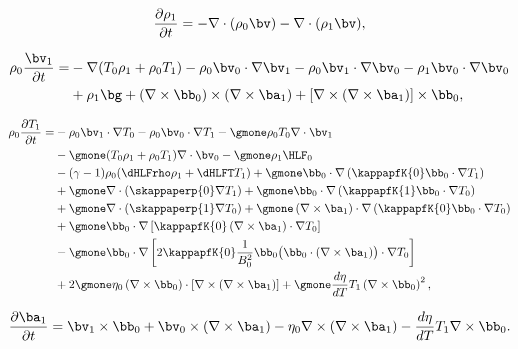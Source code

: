 {\customEquationFont

\begin{equation} \label{eq: linearised_continuity}
  \frac{\partial \rho_1}{\partial t} = -\nabla \cdot (\rho_0 \bv) - \nabla \cdot (\rho_1 \bv),
\end{equation}

\begin{equation} \label{eq: linearised_momentum}
  \begin{aligned}
    \rho_0\frac{\bv_1}{\partial t} =&
      -\nabla(T_0\rho_1 + \rho_0 T_1)
      - \rho_0 \bv_0 \cdot \nabla\bv_1
      - \rho_0\bv_1 \cdot \nabla \bv_0
      - \rho_1 \bv_0 \cdot \nabla \bv_0 \\
      \quad&
      + \rho_1 \bg
      + (\nabla \times \bb_0) \times (\nabla \times \ba_1)
      + [\nabla \times (\nabla \times \ba_1)] \times \bb_0,
  \end{aligned}
\end{equation}

\begingroup
\allowdisplaybreaks
\begin{equation} \label{eq: linearised_energy}
  \begin{aligned}
    \rho_0\frac{\partial T_1}{\partial t} =&
      - \rho_0\bv_1 \cdot \nabla T_0
      - \rho_0 \bv_0 \cdot \nabla T_1
      - \gmone\rho_0 T_0 \nabla \cdot \bv_1 \\
      \quad&
      - \gmone(T_0 \rho_1 + \rho_0 T_1)\nabla \cdot \bv_0
      - \gmone\rho_1 \HLF_0 \\
      \quad&
      - (\gamma - 1)\rho_0(\dHLFrho \rho_1 + \dHLFT T_1)
      + \gmone \bb_0 \cdot \nabla\left(\kappapfK{0}\bb_0 \cdot \nabla T_1 \right) \\
      \quad&
      + \gmone \nabla \cdot \left(\skappaperp{0}\nabla T_1\right)
      + \gmone \bb_0 \cdot \nabla \left(\kappapfK{1} \bb_0 \cdot \nabla T_0\right) \\
      \quad&
      + \gmone \nabla \cdot \left(\skappaperp{1} \nabla T_0\right)
      + \gmone \left(\nabla \times \ba_1\right) \cdot \nabla \left(\kappapfK{0}\bb_0 \cdot \nabla T_0\right) \\
      \quad&
      + \gmone \bb_0 \cdot \nabla \left[\kappapfK{0}\left(\nabla \times \ba_1\right) \cdot \nabla T_0\right] \\
      \quad&
      - \gmone \bb_0 \cdot \nabla \left[
        2\kappapfK{0}\frac{1}{B_0^2}\bb_0\bigl(\bb_0 \cdot \left(\nabla \times \ba_1\right)\bigr) \cdot \nabla T_0
      \right] \\
      \quad&
      + 2 \gmone \eta_0 \left(\nabla \times \bb_0\right)\cdot \left[\nabla \times \left(\nabla \times \ba_1\right)\right]
      + \gmone \frac{d\eta}{dT}T_1\left(\nabla \times \bb_0\right)^2, \\
  \end{aligned}
\end{equation}
\endgroup

\begin{equation} \label{eq: linearised_induction}
  \frac{\partial \ba_1}{\partial t} =
    \bv_1 \times \bb_0
    + \bv_0 \times \left(\nabla \times \ba_1\right)
    - \eta_0 \nabla \times \left(\nabla \times \ba_1\right)
    - \frac{d\eta}{dT}T_1 \nabla \times \bb_0.
\end{equation}
}



